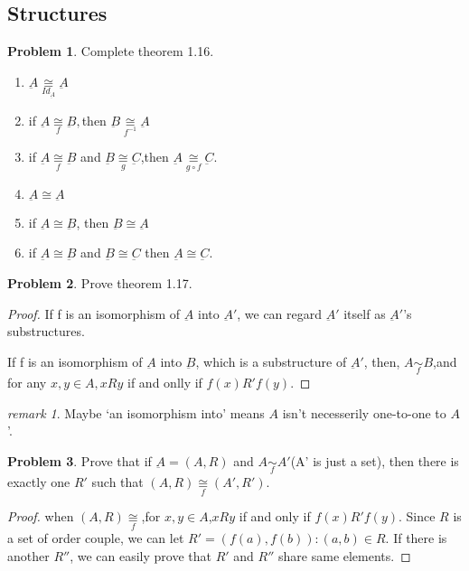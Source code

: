 \documentclass[a4paper,11pt]{article}%
\theoremstyle{remark}
\newtheorem*{remark}{remark}
\theoremstyle{definition}
\newtheorem{problem}{Problem}[subsection]
\begin{document}
\subsection{Structures}
\begin{problem}
    Complete theorem 1.16.

    \begin{enumerate}
        \item $\underbar{A}\underset{Id_{\underbar{A}}}{\cong}\underbar{A}$
        \item if $\underbar{A}\underset{f}{\cong}\underbar{B},$then $\underbar{B}\underset{f^{-1}}{\cong}\underbar{A}$
        \item if $\underbar{A}\underset{f}{\cong}\underbar{B}$ and $\underbar{B}\underset{g}{\cong}\underbar{C}$,then $\underbar{A}\underset{g\circ f}{\cong}\underbar{C}$.
    \item $\underbar{A}\cong \underbar{A}$
    \item if $\underbar{A}\cong \underbar{B}$, then $\underbar{B}\cong \underbar{A}$
    \item if $\underbar{A}\cong \underbar{B}$ and $\underbar{B}\cong \underbar{C}$ then $\underbar{A}\cong \underbar{C}$.
\end{enumerate}
\end{problem}
\begin{problem}
    Prove theorem 1.17.
    \begin{proof}
       If f is an isomorphism of $\underbar{A}$ into $\underbar{A}'$,
       we can regard $\underbar{A}'$ itself as $\underbar{A}'$'s substructures.
       
       If f is an isomorphism of $\underbar{A}$ into $\underbar{B}$, which is a
       substructure of $\underbar{A}'$, then, $A\underset{f}{\sim}B$,and for any
       $x,y\in A,xRy$ if and onlly if $f(x)R'f(y)$.
    \end{proof}
    \begin{remark}
        Maybe `an isomorphism into' means $A$ isn't necesserily one-to-one 
        to $A$'.
    \end{remark}
\end{problem}
\begin{problem}
    Prove that if $\underbar{A}=(A,R)$ and $A\underset{f}{\sim}A'$(A' is just a set),
    then there is exactly one $R'$ such that $(A,R)\underset{f}{\cong}(A',R')$.
    \begin{proof}
        when $(A,R)\underset{f}{\cong}$,for $x,y\in A$,$xRy$ if and only if
        $f(x)R'f(y)$.
        Since $R$ is a set of order couple, we can let $R'={(f(a),f(b)):(a,b)\in R}$.
        If there is another $R''$, we can easily prove that $R'$ and $R''$ share same 
        elements.
    \end{proof}
\end{problem}
\end{document}
